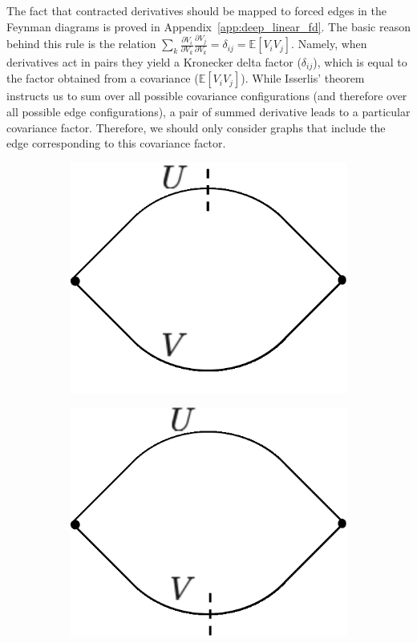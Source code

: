 \documentclass[english]{article}
\newcommand{\dho}{\partial}
\newcommand{\lexp}{\mathbb{E}\left[}
\newcommand{\rexp}{\right]}
\begin{document}
The fact that contracted derivatives should be mapped to forced edges in the Feynman diagrams is proved in Appendix~\ref{app:deep_linear_fd}.
The basic reason behind this rule is the relation $\sum_k \frac{\dho V_i}{\dho V_k} \frac{\dho V_j}{\dho V_k} = \delta_{ij} = \lexp V_i V_j \rexp$.
Namely, when derivatives act in pairs they yield a Kronecker delta factor ($\delta_{ij}$), which is equal to the factor obtained from a covariance ($\lexp V_i V_j \rexp$).
While Isserlis' theorem instructs us to sum over all possible covariance configurations (and therefore over all possible edge configurations), a pair of summed derivative leads to a particular covariance factor.
Therefore, we should only consider graphs that include the edge corresponding to this covariance factor.

\begin{figure}
  \centering
\begin{subfigure}[b]{0.17\textwidth}
        \includegraphics[width=\textwidth]{new_figs/df_2_1hla}
        \caption{}
        \label{fig:df_2_1hla}
    \end{subfigure}
    \quad\quad\quad\quad\quad
\begin{subfigure}[b]{0.17\textwidth}
        \includegraphics[width=\textwidth]{new_figs/df_2_1hlb}

\end{subfigure}
\end{figure}
\end{document}
